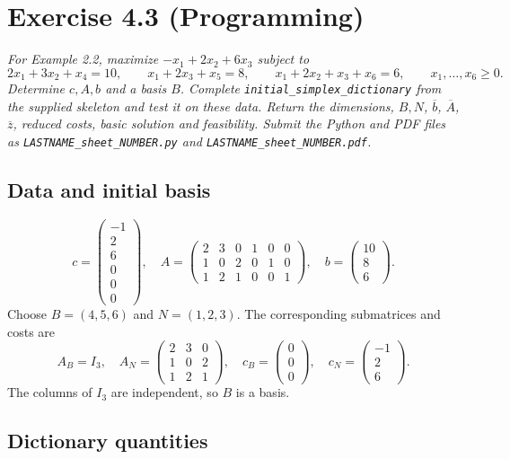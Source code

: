 \documentclass[a4paper,11pt]{article}
\newif\ifexplain
\newcommand{\aufgabe}[1]{\section*{Exercise #1}}
\newcommand{\angabe}[1]{\textit{#1}\par\smallskip}
\newcommand{\teil}[1]{\subsection*{#1}}
\newcommand{\explain}[1]{\ifexplain\begin{erklbox}#1\end{erklbox}\fi}
\begin{document}
\aufgabe{4.3 (Programming)}
\angabe{For Example 2.2, maximize $-x_1+2x_2+6x_3$ subject to
\[
2x_1+3x_2+x_4=10,\qquad x_1+2x_3+x_5=8,\qquad
x_1+2x_2+x_3+x_6=6,\qquad x_1,\ldots,x_6\geq0.
\]
Determine $c,A,b$ and a basis $B$. Complete \texttt{initial\_simplex\_dictionary} from the supplied skeleton and test it on these data. Return the dimensions, $B,N$, $\overline b$, $\overline A$, $\overline z$, reduced costs, basic solution and feasibility. Submit the Python and PDF files as \texttt{LASTNAME\_sheet\_NUMBER.py} and \texttt{LASTNAME\_sheet\_NUMBER.pdf}.}
\teil{Data and initial basis}
\[
\boxed{c=\begin{pmatrix}-1\\2\\6\\0\\0\\0\end{pmatrix},\quad
A=\begin{pmatrix}2&3&0&1&0&0\\1&0&2&0&1&0\\1&2&1&0&0&1\end{pmatrix},\quad
b=\begin{pmatrix}10\\8\\6\end{pmatrix}.}
\]
Choose $B=(4,5,6)$ and $N=(1,2,3)$. The corresponding submatrices and costs are
\[
A_B=I_3,\quad A_N=\begin{pmatrix}2&3&0\\1&0&2\\1&2&1\end{pmatrix},\quad
c_B=\begin{pmatrix}0\\0\\0\end{pmatrix},\quad c_N=\begin{pmatrix}-1\\2\\6\end{pmatrix}.
\]
The columns of $I_3$ are independent, so $B$ is a basis.
\explain{Die letzten drei Spalten sind die Schlupfvariablen und bilden die Einheitsmatrix. Deshalb ist diese Basis für den Start praktisch. In der Mathematik zählen wir die Variablen ab eins. Python zählt ab null: Der Aufruf verwendet also \texttt{B=[3,4,5]}, nicht \texttt{[4,5,6]}. Die Reihenfolge bleibt wichtig, weil sie die Reihenfolge von $x_B$ und $\overline b$ festlegt.}
\teil{Dictionary quantities}
\end{document}
